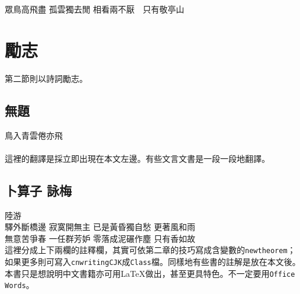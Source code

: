 眾鳥高飛盡  孤雲獨去閒  相看兩不厭　只有敬亭山
\section{勵志} 
第二節則以詩詞勵志。
\subsection{無題}

鳥入青雲倦亦飛\\
\\
這裡的翻譯是採立即出現在本文左邊。有些文言文書是一段一段地翻譯。

\subsection{卜算子 詠梅}

陸游\\
驛外斷橋邊 寂寞開無主 已是黃昏獨自愁 更著風和雨\\
無意苦爭春 一任群芳妒 零落成泥碾作塵 只有香如故\\
這裡分成上下兩欄的註釋欄，其實可依第二章的技巧寫成含變數的{\tt newtheorem}；如果更多則可寫入{\tt cnwritingCJK}成{\tt Class}檔。同樣地有些書的註解是放在本文後。本書只是想說明中文書籍亦可用\LaTeX{}做出，甚至更具特色。不一定要用{\tt Office Words}。

